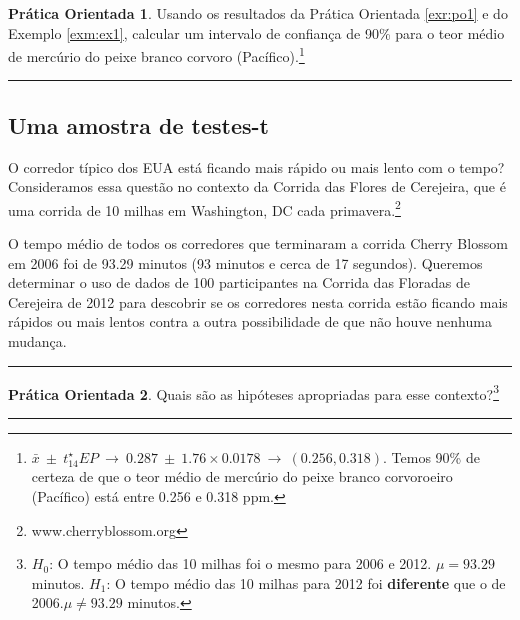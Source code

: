 \documentclass[
]{book}
\theoremstyle{definition}
\theoremstyle{definition}
\theoremstyle{definition}
\newtheorem{exercise}{Prática Orientada}[chapter]
\theoremstyle{definition}
\theoremstyle{remark}
\begin{document}
\begin{exercise}
\protect\hypertarget{exr:unnamed-chunk-193}{}{\label{exr:unnamed-chunk-193} }Usando os resultados da Prática Orientada \ref{exr:po1} e do Exemplo \ref{exm:ex1}, calcular um intervalo de confiança de 90\% para o teor médio de mercúrio do peixe branco corvoro (Pacífico).\footnote{\(\bar{x} \ \pm\ t^{\star}_{14} EP \ \to\  0.287 \ \pm\  1.76\times 0.0178\ \to\ (0.256, 0.318)\). Temos 90\% de certeza de que o teor médio de mercúrio do peixe branco corvoroeiro (Pacífico) está entre 0.256 e 0.318 ppm.}
\end{exercise}

\begin{center}\rule{0.5\linewidth}{0.5pt}\end{center}

\hypertarget{testsTOneSample}{%
\subsection{Uma amostra de testes-t}\label{testsTOneSample}}

O corredor típico dos EUA está ficando mais rápido ou mais lento com o tempo? Consideramos essa questão no contexto da Corrida das Flores de Cerejeira, que é uma corrida de 10 milhas em Washington, DC cada primavera.\footnote{www.cherryblossom.org}

O tempo médio de todos os corredores que terminaram a corrida Cherry Blossom em 2006 foi de 93.29 minutos (93 minutos e cerca de 17 segundos). Queremos determinar o uso de dados de 100 participantes na Corrida das Floradas de Cerejeira de 2012 para descobrir se os corredores nesta corrida estão ficando mais rápidos ou mais lentos contra a outra possibilidade de que não houve nenhuma mudança.

\begin{center}\rule{0.5\linewidth}{0.5pt}\end{center}

\begin{exercise}
\protect\hypertarget{exr:unnamed-chunk-194}{}{\label{exr:unnamed-chunk-194} }Quais são as hipóteses apropriadas para esse contexto?\footnote{\(H_0\): O tempo médio das 10 milhas foi o mesmo para 2006 e 2012. \(\mu = 93.29\) minutos. \(H_1\): O tempo médio das 10 milhas para 2012 foi \textbf{diferente} que o de 2006.\(\mu \neq 93.29\) minutos.}
\end{exercise}

\begin{center}\rule{0.5\linewidth}{0.5pt}\end{center}
\end{document}
